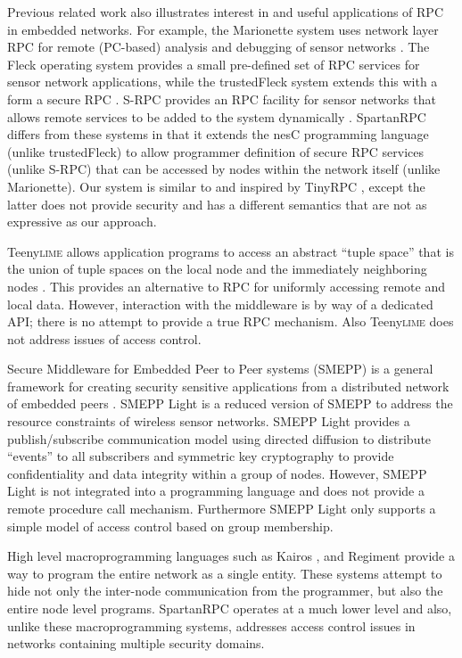 Previous related work also illustrates interest in and useful applications of RPC in embedded
networks. For example, the Marionette system uses network layer RPC for remote (PC-based)
analysis and debugging of sensor networks \cite{whitehouse-marionette-2006}. The Fleck operating
system provides a small pre-defined set of RPC services for sensor network applications, while
the trustedFleck system extends this with a form a secure RPC
\cite{hu-secfleck-2009,Hu:2010:TTW:1806895.1806900}. S-RPC provides an RPC facility for sensor
networks that allows remote services to be added to the system dynamically \cite{5766863}.
SpartanRPC differs from these systems in that it extends the nesC programming language (unlike
trustedFleck) to allow programmer definition of secure RPC services (unlike S-RPC) that can be
accessed by nodes within the network itself (unlike Marionette). Our system is similar to and
inspired by TinyRPC \cite{may-tinyrpc-2007}, except the latter does not provide security and has
a different semantics that are not as expressive as our approach.

Teeny\textsc{lime} allows application programs to access an abstract ``tuple space'' that is the
union of tuple spaces on the local node and the immediately neighboring nodes
\cite{Costa:2007:PWS:1516124.1516153}. This provides an alternative to RPC for uniformly
accessing remote and local data. However, interaction with the middleware is by way of a
dedicated API; there is no attempt to provide a true RPC mechanism. Also Teeny\textsc{lime} does
not address issues of access control.

Secure Middleware for Embedded Peer to Peer systems (SMEPP) is a general framework for creating
security sensitive applications from a distributed network of embedded peers
\cite{Brogi:2008:SME:1363370.1363548}. SMEPP Light \cite{Vairo:2008:SMW:1594978.1595054} is a
reduced version of SMEPP to address the resource constraints of wireless sensor networks. SMEPP
Light provides a publish/subscribe communication model using directed diffusion
\cite{intanagonwiwat-2003} to distribute ``events'' to all subscribers and symmetric key
cryptography to provide confidentiality and data integrity within a group of nodes. However,
SMEPP Light is not integrated into a programming language and does not provide a remote
procedure call mechanism. Furthermore SMEPP Light only supports a simple model of access control
based on group membership.

High level macro\-programming languages such as Kairos \cite{springerlink:10.1007/1150259312},
and Regiment \cite{Newton:2007:RMS:1236360.1236422} provide a way to program the entire network
as a single entity. These systems attempt to hide not only the inter-node communication from the
programmer, but also the entire node level programs. SpartanRPC operates at a much lower level
and also, unlike these macro\-programming systems, addresses access control issues in networks
containing multiple security domains.

